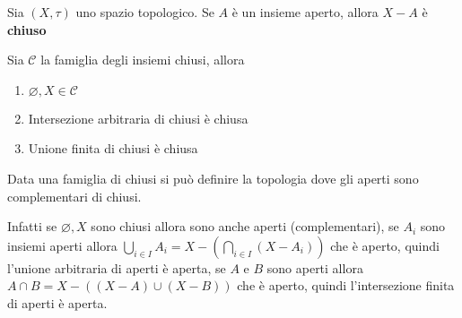 \begin{definition}
    Sia \((X, \tau)\) uno spazio topologico. Se \(A\) è un insieme aperto,
    allora \(X - A\) è \textbf{chiuso}
\end{definition}
\begin{note}
    Sia \(\mathcal{C}\) la famiglia degli insiemi chiusi, allora
\begin{enumerate}[label = \arabic*)]
    \item \(\varnothing, X \in \mathcal{C}\) 
    \item Intersezione arbitraria di chiusi è chiusa
    \item Unione finita di chiusi è chiusa
\end{enumerate}
Data una famiglia di chiusi si può definire la topologia dove gli aperti
sono complementari di chiusi.

Infatti se \(\varnothing, X\) sono chiusi allora sono anche aperti
(complementari), se \(A_{i}\) sono insiemi aperti allora \(\bigcup_{i \in  I} A_{i} = X - (\bigcap_{i \in  I} (X -
A_{i}))\) che è aperto, quindi l'unione arbitraria di aperti è aperta, se \(A\)
e \(B\) sono aperti allora \(A \cap  B = X - ((X - A) \cup (X - B))\) che è
aperto, quindi l'intersezione finita di aperti è aperta.
\end{note}

